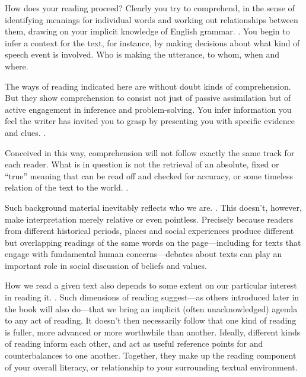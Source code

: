 \TiGanSpace

How does your reading proceed? Clearly you try to comprehend, in the
sense of identifying meanings for individual words and working out
relationships between them, drawing on your implicit knowledge of
English grammar. \linefill. You begin to infer a context for
the text, for instance, by making decisions about what kind of speech
event is involved. Who is making the utterance, to whom, when and where.

The ways of reading indicated here are without doubt kinds of
comprehension. But they show comprehension to consist not just of
passive assimilation but of active engagement in inference and
problem-solving. You infer information you feel the writer has invited
you to grasp by presenting you with specific evidence and clues. \linefill.

Conceived in this way, comprehension will not follow exactly the same
track for each reader. What is in question is not the retrieval of an
absolute, fixed or ``true'' meaning that can be read off and checked for
accuracy, or some timeless relation of the text to the world. \linefill.

Such background material inevitably reflects who we are. \linefill. This doesn't, however, make interpretation merely
relative or even pointless. Precisely because readers from different
historical periods, places and social experiences produce different but
overlapping readings of the same words on the page---including for
texts that engage with fundamental human concerns---debates about
texts can play an important role in social discussion of beliefs and
values.

How we read a given text also depends to some extent on our particular
interest in reading it. \linefill. Such dimensions of reading
suggest---as others introduced later in the book will also
do---that we bring an implicit (often unacknowledged) agenda to any
act of reading. It doesn't then necessarily follow that one kind of
reading is fuller, more advanced or more worthwhile than another.
Ideally, different kinds of reading inform each other, and act as useful
reference points for and counterbalances to one another. Together, they
make up the reading component of your overall literacy, or relationship
to your surrounding textual environment.

